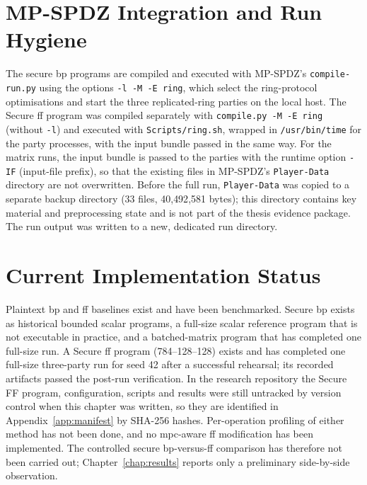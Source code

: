 \section{MP-SPDZ Integration and Run Hygiene}\label{sec:impl-integration}
The secure \ac{bp} programs are compiled and executed with MP-SPDZ's \texttt{compile-run.py} using the options \texttt{-l -M -E ring}, which select the ring-protocol optimisations and start the three replicated-ring parties on the local host. The Secure \ac{ff} program was compiled separately with \texttt{compile.py -M -E ring} (without \texttt{-l}) and executed with \texttt{Scripts/ring.sh}, wrapped in \texttt{/usr/bin/time} for the party processes, with the input bundle passed in the same way. For the matrix runs, the input bundle is passed to the parties with the runtime option \texttt{-IF} (input-file prefix), so that the existing files in MP-SPDZ's \texttt{Player-Data} directory are not overwritten. Before the full run, \texttt{Player-Data} was copied to a separate backup directory (33 files, 40{,}492{,}581 bytes); this directory contains key material and preprocessing state and is not part of the thesis evidence package. The run output was written to a new, dedicated run directory.

\section{Current Implementation Status}\label{sec:impl-status}
Plaintext \ac{bp} and \ac{ff} baselines exist and have been benchmarked. Secure \ac{bp} exists as historical bounded scalar programs, a full-size scalar reference program that is not executable in practice, and a batched-matrix program that has completed one full-size run. A Secure \ac{ff} program (784--128--128) exists and has completed one full-size three-party run for seed 42 after a successful rehearsal; its recorded artifacts passed the post-run verification. In the research repository the Secure FF program, configuration, scripts and results were still untracked by version control when this chapter was written, so they are identified in Appendix~\ref{app:manifest} by SHA-256 hashes. Per-operation profiling of either method has not been done, and no \ac{mpc}-aware \ac{ff} modification has been implemented. The controlled secure \ac{bp}-versus-\ac{ff} comparison has therefore not been carried out; Chapter~\ref{chap:results} reports only a preliminary side-by-side observation.
